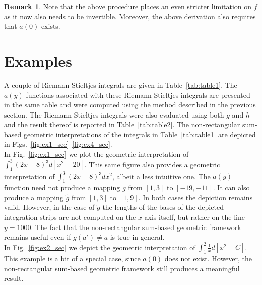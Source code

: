 \documentclass{article}
\theoremstyle{theorem}
\theoremstyle{definition}
\newtheorem*{remark}{Remark}
\begin{document}
\begin{remark}
Note that the above procedure places an even stricter limitation on $f$ as it now also needs to be invertible. Moreover, the 
above derivation also requires that $a(0)$ exists.
\end{remark}


\section{Examples}
A couple of Riemann-Stieltjes integrals are given in Table~\ref{tab:table1}. The $a(y)$ functions associated 
with these Riemann-Stieltjes integrals are presented in the same table and were computed using the method 
described in the previous section. The Riemann-Stieltjes integrals were also evaluated using both $g$ and $h$ and the result
thereof is reported in Table~\ref{tab:table2}. The non-rectangular sum-based geometric interpretations of the integrals in Table~\ref{tab:table1} are depicted in Figs.~\ref{fig:ex1_sec}--\ref{fig:ex4_sec}.\\

\noindent
In Fig.~\ref{fig:ex1_sec} we plot the geometric interpretation of $\int_{1}^3 (2x+8)^3 d[x^2-20]$. This same figure also 
provides a geometric interpretation of $\int_{1}^3 (2x+8)^3 dx^2$, albeit a less intuitive one. The $a(y)$ function need not 
produce a mapping $g$ from $[1,3]$ to $[-19,-11]$. It can also produce a mapping $\widetilde{g}$ from $[1,3]$ to $[1,9]$. In both cases the 
depiction remains valid. However, in the case of $\widetilde{g}$ the lengths of the bases of the depicted integration strips are not 
computed on the $x$-axis itself, but rather on the line $y=1000$. The fact that the non-rectangular sum-based geometric framework remains useful even if $g(a')\neq a$ is true in general.\\

\noindent
In Fig.~\ref{fig:ex2_sec} we depict the geometric interpretation of $\int_1^2 \frac{1}{x} d[x^2+C]$. This example is a bit of a special case, since $a(0)$ does not exist. 
However, the non-rectangular sum-based geometric framework still produces a meaningful result.\\  
\end{document}
